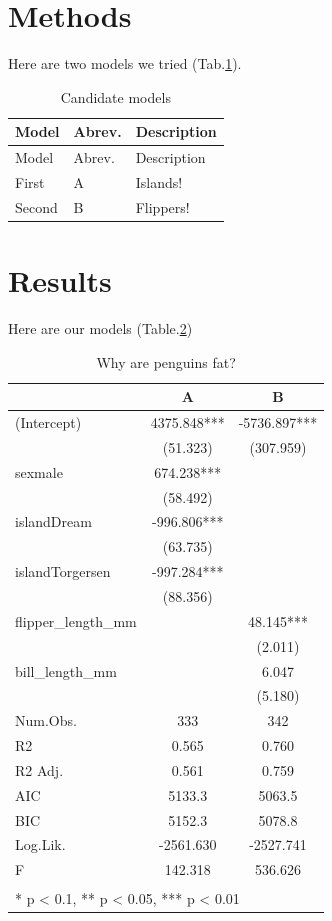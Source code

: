 \documentclass[
]{article}
\begin{document}
\hypertarget{methods}{%
\section{Methods}\label{methods}}

Here are two models we tried (Tab.\ref{tab:simple-table}).

\begin{longtable}[]{@{}lll@{}}
\caption{\label{tab:simple-table} Candidate models}\tabularnewline
\toprule
Model & Abrev. & Description\tabularnewline
\midrule
\endfirsthead
\toprule
Model & Abrev. & Description\tabularnewline
\midrule
\endhead
First & A & Islands!\tabularnewline
Second & B & Flippers!\tabularnewline
\bottomrule
\end{longtable}

\newpage

\hypertarget{results}{%
\section{Results}\label{results}}

Here are our models (Table.\ref{tab:flipper-model})

\begin{table}

\caption{\label{tab:flipper-model}Why are penguins fat?}
\centering
\begin{tabular}[t]{lcc}
\toprule
  & A & B\\
\midrule
(Intercept) & 4375.848*** & -5736.897***\\
 & (51.323) & (307.959)\\
sexmale & 674.238*** & \\
 & (58.492) & \\
islandDream & -996.806*** & \\
 & (63.735) & \\
islandTorgersen & -997.284*** & \\
 & (88.356) & \\
flipper\_length\_mm &  & 48.145***\\
 &  & (2.011)\\
bill\_length\_mm &  & 6.047\\
 &  & (5.180)\\
\midrule
Num.Obs. & 333 & 342\\
R2 & 0.565 & 0.760\\
R2 Adj. & 0.561 & 0.759\\
AIC & 5133.3 & 5063.5\\
BIC & 5152.3 & 5078.8\\
Log.Lik. & -2561.630 & -2527.741\\
F & 142.318 & 536.626\\
\bottomrule
\multicolumn{3}{l}{\textsuperscript{} * p < 0.1, ** p < 0.05, *** p < 0.01}\\
\end{tabular}
\end{table}
\end{document}
